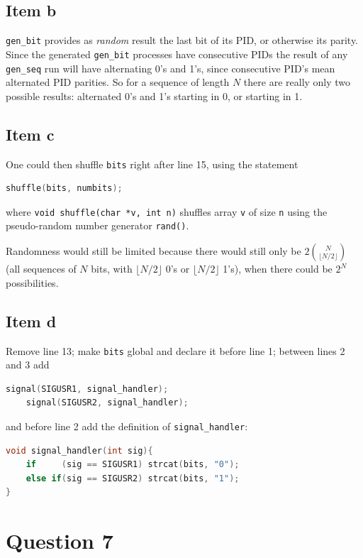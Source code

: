 {\subsection{Item b}
\texttt{gen\_bit} provides as \emph{random} result the last bit of its PID, or otherwise its parity. Since the generated \texttt{gen\_bit} processes have consecutive PIDs the result of any \texttt{gen\_seq} run will have alternating 0's and 1's, since consecutive PID's mean alternated PID parities. So for a sequence of length $N$ there are really only two possible results: alternated 0's and 1's starting in 0, or starting in 1.

\subsection{Item c}
One could then shuffle \texttt{bits} right after line 15, using the statement
\begin{lstlisting}[language=C]
    shuffle(bits, numbits);
\end{lstlisting}
where \texttt{void shuffle(char *v, int n)} shuffles array \texttt{v} of size \texttt{n} using the pseudo-random number generator \texttt{rand()}.

Randomness would still be limited because there would still only be $2\binom{N}{\lfloor N/2 \rfloor}$ (all sequences of $N$ bits, with $\lfloor N/2 \rfloor$ 0's or $\lfloor N/2 \rfloor$ 1's), when there could be $2^N$ possibilities.

\subsection{Item d}
Remove line 13; make \texttt{bits} global and declare it before line 1; between lines 2 and 3 add
\begin{lstlisting}[language=C]
    signal(SIGUSR1, signal_handler);
    signal(SIGUSR2, signal_handler);
\end{lstlisting}
and before line 2 add the definition of \texttt{signal\_handler}:
\begin{lstlisting}[language=C]
void signal_handler(int sig){
    if     (sig == SIGUSR1) strcat(bits, "0");
    else if(sig == SIGUSR2) strcat(bits, "1");
}
\end{lstlisting}

\section{Question 7}
}
